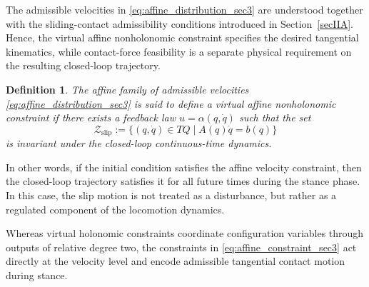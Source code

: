 \documentclass[letterpaper, 10 pt, conference]{ieeeconf}
\newtheorem{definition}{Definition}
\begin{document}
The admissible velocities in \eqref{eq:affine_distribution_sec3} are understood together with
the sliding-contact admissibility conditions introduced in
Section~\ref{secIIA}. Hence, the virtual affine nonholonomic constraint specifies
the desired tangential kinematics, while contact-force feasibility is a
separate physical requirement on the resulting closed-loop trajectory.

\begin{definition}
The affine family of admissible velocities \eqref{eq:affine_distribution_sec3} is said to define a \emph{virtual affine nonholonomic constraint} if there exists a feedback law $u=\alpha(q,\dot q)$ such that the set
\[
\mathcal Z_{\mathrm{slip}}
:=
\{(q,\dot q)\in TQ \mid A(q)\dot q=b(q)\}
\]
is invariant under the closed-loop continuous-time dynamics.
\end{definition}

In other words, if the initial condition satisfies the affine velocity constraint, then the closed-loop trajectory satisfies it for all future times during the stance phase. In this case, the slip motion is not treated as a disturbance, but rather as a regulated component of the locomotion dynamics.

Whereas virtual holonomic constraints coordinate configuration variables through outputs of relative degree two, the constraints in \eqref{eq:affine_constraint_sec3} act directly at the velocity level and encode admissible tangential contact motion during stance.
\end{document}
